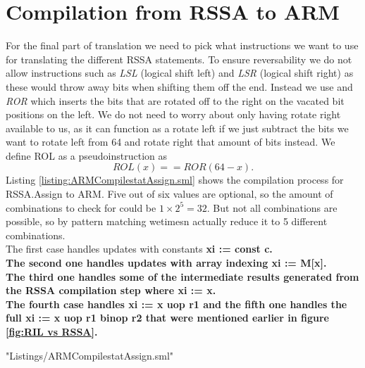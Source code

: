 \section{Compilation from RSSA to ARM}
For the final part of translation we need to pick what instructions we want to use for translating the different RSSA statements.
To ensure reversability we do not allow instructions such as \emph{LSL} (logical shift left) and \emph{LSR} (logical shift right) as these would throw away bits when shifting them off the end. Instead we use and \emph{ROR} which inserts the bits that are rotated off to the right on the vacated bit positions on the left. We do not need to worry about only having rotate right available to us, as it can function as a rotate left if we just subtract the bits we want to rotate left from 64 and rotate right that amount of bits instead. We define ROL as a pseudoinstruction as
\begin{equation*}
  ROL(x) == ROR(64-x).
\end{equation*}
Listing \ref{listing:ARMCompilestatAssign.sml} shows the compilation process for RSSA.Assign to ARM. Five out of six values are optional, so the amount of combinations to check for could be $1 \times 2^5 = 32$. But not all combinations are possible, so by pattern matching wetimesn actually reduce it to 5 different combinations.\\
The first case handles updates with constants \bf{xi := const c}. \\
The second one handles updates with array indexing \bf{xi := M[x]}.\\
The third one handles some of the intermediate results generated from the RSSA compilation step where \bf{xi := x}.\\
The fourth case handles \bf{xi := x uop r1} and the fifth one handles the full \bf{xi := x uop r1 binop r2} that were mentioned earlier in figure \ref{fig:RIL vs RSSA}.

 {"Listings/ARMCompilestatAssign.sml"}
